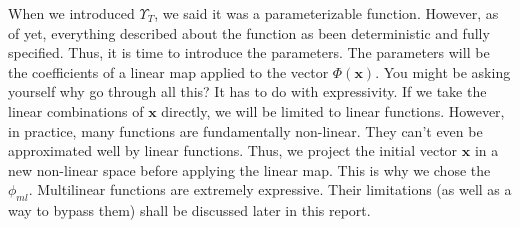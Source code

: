 \documentclass{article}
\theoremstyle{definition}
\theoremstyle{definition}
\begin{document}
When we introduced $\Upsilon_{T}$, we said it was a parameterizable function. However, as of yet, everything described about the function as been deterministic and fully specified. Thus, it is time to introduce the parameters. The parameters will be the coefficients of a linear map applied to the vector $\Phi(\mathbf{x})$. You might be asking yourself why go through all this? It has to do with expressivity. If we take the linear combinations of $\mathbf{x}$ directly, we will be limited to linear functions. However, in practice, many functions are fundamentally non-linear. They can't even be approximated well by linear functions. Thus, we project the initial vector $\mathbf{x}$ in a new non-linear space before applying the linear map. This is why we chose the $\phi_{ml}$. Multilinear functions are extremely expressive. Their limitations (as well as a way to bypass them) shall be discussed later in this report. \\ 
\end{document}
